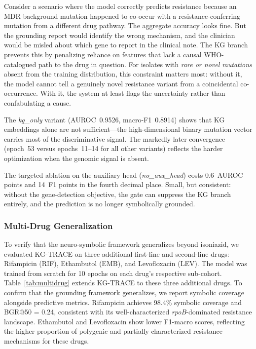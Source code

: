 \documentclass[conference]{IEEEtran}
\begin{document}
Consider a scenario where the model correctly predicts resistance because an MDR background mutation happened to co-occur with a resistance-conferring mutation from a different drug pathway. The aggregate accuracy looks fine. But the grounding report would identify the wrong mechanism, and the clinician would be misled about which gene to report in the clinical note. The KG branch prevents this by penalizing reliance on features that lack a causal WHO-catalogued path to the drug in question. For isolates with \emph{rare or novel mutations} absent from the training distribution, this constraint matters most: without it, the model cannot tell a genuinely novel resistance variant from a coincidental co-occurrence. With it, the system at least flags the uncertainty rather than confabulating a cause.

The \textit{kg\_only} variant (AUROC~0.9526, macro-F1~0.8914) shows that KG embeddings alone are not sufficient---the high-dimensional binary mutation vector carries most of the discriminative signal. The markedly later convergence (epoch~53 versus epochs~11--14 for all other variants) reflects the harder optimization when the genomic signal is absent.

The targeted ablation on the auxiliary head (\textit{no\_aux\_head}) costs 0.6~AUROC points and 14~F1 points in the fourth decimal place. Small, but consistent: without the gene-detection objective, the gate can suppress the KG branch entirely, and the prediction is no longer symbolically grounded.

\subsubsection{Multi-Drug Generalization}
To verify that the neuro-symbolic framework generalizes beyond isoniazid, we evaluated KG-TRACE on three additional first-line and second-line drugs: Rifampicin (RIF), Ethambutol (EMB), and Levofloxacin (LEV). The model was trained from scratch for 10 epochs on each drug's respective sub-cohort. Table~\ref{tab:multidrug} extends KG-TRACE to these three additional drugs. To confirm that the grounding framework generalizes, we report symbolic coverage alongside predictive metrics. Rifampicin achieves 98.4\% symbolic coverage and BGR@50 = 0.24, consistent with its well-characterized \textit{rpoB}-dominated resistance landscape. Ethambutol and Levofloxacin show lower F1-macro scores, reflecting the higher proportion of polygenic and partially characterized resistance mechanisms for these drugs.
\end{document}
